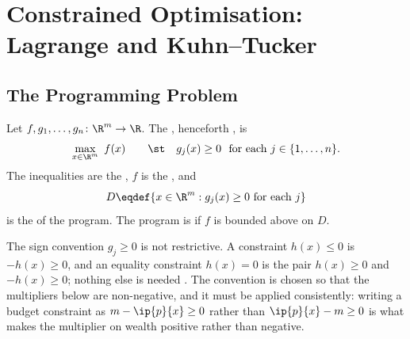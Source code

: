 
\chapter{Constrained Optimisation: Lagrange and Kuhn--Tucker}
\label{ch:optimization}

\section{The Programming Problem}\label{sec:opt-formulation}

\begin{definition}\label{def:program}
	Let $f,g_1,\dots,g_n\colon\R^m\to\R$. The , henceforth , is
	\begin{equation}\label{eq:problem-1}
		\max_{x\in\R^m}\ f(x)
		\qquad\st\quad g_j(x)\geq0\ \text{ for each }j\in\{1,\dots,n\}.
	\end{equation}
	The inequalities are the , $f$ is the
	, and
	\[
		D\eqdef\{x\in\R^m : g_j(x)\geq0\ \text{for each }j\}
	\]
	is the  of the program. The program is
	 if $f$ is bounded above on $D$.
\end{definition}

The sign convention $g_j\geq0$ is not restrictive. A constraint $h(x)\leq0$ is
$-h(x)\geq0$, and an equality constraint $h(x)=0$ is the pair
$h(x)\geq0$ and $-h(x)\geq0$; nothing else is needed
\autocite[slide 4]{fukuda2026optimization}. The convention is chosen so that the
multipliers below are non-negative, and it must be applied consistently: writing
a budget constraint as $m-\ip{p}{x}\geq0$ rather than $\ip{p}{x}-m\geq0$ is what
makes the multiplier on wealth positive rather than negative.

